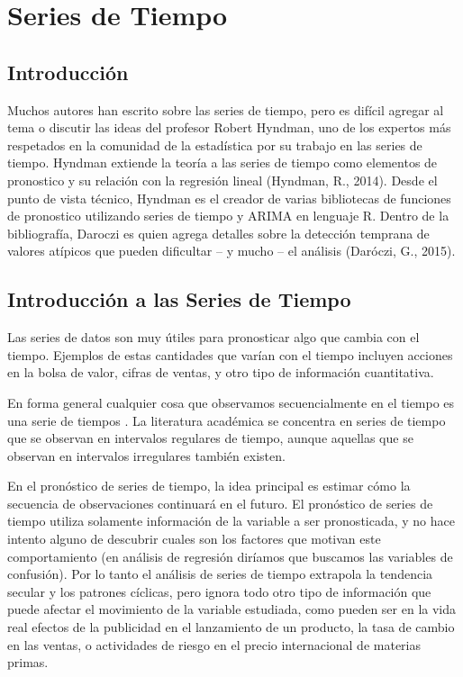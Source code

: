 \section*{Series de Tiempo}

\subsection*{Introducción}
Muchos autores han escrito sobre las series de tiempo, pero es difícil agregar al tema o discutir las ideas del profesor Robert Hyndman, uno de los expertos más respetados en la comunidad de la estadística por su trabajo en las series de tiempo. Hyndman extiende la teoría a las series de tiempo como elementos de pronostico y su relación con la regresión lineal (Hyndman, R., 2014). Desde el punto de vista técnico, Hyndman es el creador de varias bibliotecas de funciones de pronostico utilizando series de tiempo y ARIMA en lenguaje R. Dentro de la bibliografía, Daroczi es quien agrega detalles sobre la detección temprana de valores atípicos que pueden dificultar – y mucho – el análisis (Daróczi, G., 2015). 

\subsection*{Introducción a las Series de Tiempo}
Las series de datos son muy útiles para pronosticar algo que cambia con el tiempo. Ejemplos de estas cantidades que varían con el tiempo incluyen acciones en la bolsa de valor, cifras de ventas, y otro tipo de información cuantitativa.

En forma general cualquier cosa que observamos secuencialmente en el tiempo es una serie de tiempos \cite{hyndman}. La literatura académica se concentra en series de tiempo que se observan en intervalos regulares de tiempo, aunque aquellas que se observan en intervalos irregulares también existen. 

En el pronóstico de series de tiempo, la idea principal es estimar cómo la secuencia de observaciones continuará en el futuro. El pronóstico de series de tiempo utiliza solamente información de la variable a ser pronosticada, y no hace intento alguno de descubrir cuales son los factores que motivan este comportamiento (en análisis de regresión diríamos que buscamos las variables de confusión). Por lo tanto el análisis de series de tiempo extrapola la tendencia secular y los patrones cíclicas, pero ignora todo otro tipo de información que puede afectar el movimiento de la variable estudiada, como pueden ser en la vida real efectos de la publicidad en el lanzamiento de un producto, la tasa de cambio en las ventas, o actividades de riesgo en el precio internacional de materias primas. 

